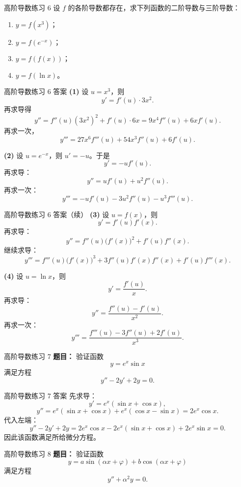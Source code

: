 ﻿\documentclass[aspectratio=169,11pt]{ctexbeamer}
\begin{document}
\begin{frame}{高阶导数练习 6}
\small
设 $f$ 的各阶导数都存在，求下列函数的二阶导数与三阶导数：
\begin{enumerate}
\item $y=f(x^3)$；
\item $y=f(e^{-x})$；
\item $y=f(f(x))$；
\item $y=f(\ln x)$。
\end{enumerate}
\end{frame}

\begin{frame}[allowframebreaks]{高阶导数练习 6 答案}
\small
\textbf{(1)} 设 $u=x^3$，则
\[
y'=f'(u)\cdot 3x^2.
\]
再求导得
\[
y''=f''(u)(3x^2)^2+f'(u)\cdot6x=9x^4f''(u)+6xf'(u).
\]
再求一次，
\[
y'''=27x^6f'''(u)+54x^3f''(u)+6f'(u).
\]

\textbf{(2)} 设 $u=e^{-x}$，则 $u'=-u$。于是
\[
y'=-uf'(u).
\]
再求导：
\[
y''=u f'(u)+u^2f''(u).
\]
再求一次：
\[
y'''=-u f'(u)-3u^2f''(u)-u^3f'''(u).
\]
\end{frame}

\begin{frame}[allowframebreaks]{高阶导数练习 6 答案（续）}
\small
\textbf{(3)} 设 $u=f(x)$，则
\[
y'=f'(u)f'(x).
\]
再求导：
\[
y''=f''(u)\bigl(f'(x)\bigr)^2+f'(u)f''(x).
\]
继续求导：
\[
y'''=f'''(u)\bigl(f'(x)\bigr)^3+3f''(u)f'(x)f''(x)+f'(u)f'''(x).
\]

\textbf{(4)} 设 $u=\ln x$，则
\[
y'=\frac{f'(u)}{x}.
\]
再求导：
\[
y''=\frac{f''(u)-f'(u)}{x^2}.
\]
再求一次：
\[
y'''=\frac{f'''(u)-3f''(u)+2f'(u)}{x^3}.
\]
\end{frame}

\begin{frame}{高阶导数练习 7}
\small
\textbf{题目：} 验证函数
\[
y=e^x\sin x
\]
满足方程
\[
y''-2y'+2y=0.
\]
\end{frame}

\begin{frame}{高阶导数练习 7 答案}
\small
先求导：
\[
y'=e^x(\sin x+\cos x),
\]
\[
y''=e^x(\sin x+\cos x)+e^x(\cos x-\sin x)=2e^x\cos x.
\]
代入左端：
\[
y''-2y'+2y
=2e^x\cos x-2e^x(\sin x+\cos x)+2e^x\sin x=0.
\]
因此该函数满足所给微分方程。
\end{frame}

\begin{frame}{高阶导数练习 8}
\small
\textbf{题目：} 验证函数
\[
y=a\sin(\alpha x+\varphi)+b\cos(\alpha x+\varphi)
\]
满足方程
\[
y''+\alpha^2y=0.
\]
\end{frame}
\end{document}
